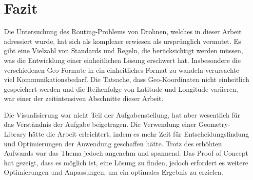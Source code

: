 \section*{Fazit}

Die Untersuchung des Routing-Problems von Drohnen, welches in dieser Arbeit adressiert wurde, hat sich als komplexer erwiesen als ursprünglich vermutet. Es gibt eine Vielzahl von Standards und Regeln, die berücksichtigt werden müssen, was die Entwicklung einer einheitlichen Lösung erschwert hat. Insbesondere die verschiedenen Geo-Formate in ein einheitliches Format zu wandeln verursachte viel Kommunikationsbedarf. Die Tatsache, dass Geo-Koordinaten nicht einheitlich gespeichert werden und die Reihenfolge von Latitude und Longitude variieren, war einer der zeitintensiven Abschnitte dieser Arbeit.

Die Visualisierung war nicht Teil der Aufgabenstellung, hat aber wesentlich für das Verständnis der Aufgabe beigetragen. Die Verwendung einer Geometry-Library hätte die Arbeit erleichtert, indem es mehr Zeit für Entscheidungsfindung und Optimierungen der Anwendung geschaffen hätte. Trotz des erhöhten Aufwands war das Thema jedoch angenehm und spannend. Das Proof of Concept hat gezeigt, dass es möglich ist, eine Lösung zu finden, jedoch erfordert es weitere Optimierungen und Anpassungen, um ein optimales Ergebnis zu erzielen.